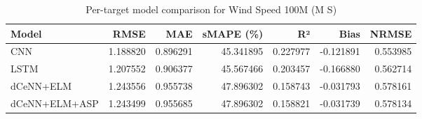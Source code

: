 \begin{table}
\caption{Per-target model comparison for Wind Speed 100M (M S)}
\begin{tabular}{lrrrrrr}
\toprule
Model & RMSE & MAE & sMAPE (\%) & R² & Bias & NRMSE \\
\midrule
CNN & 1.188820 & 0.896291 & 45.341895 & 0.227977 & -0.121891 & 0.553985 \\
LSTM & 1.207552 & 0.906377 & 45.567466 & 0.203457 & -0.166880 & 0.562714 \\
dCeNN+ELM & 1.243556 & 0.955738 & 47.896302 & 0.158743 & -0.031793 & 0.578161 \\
dCeNN+ELM+ASP & 1.243499 & 0.955685 & 47.896302 & 0.158821 & -0.031739 & 0.578134 \\
\bottomrule
\end{tabular}
\end{table}
